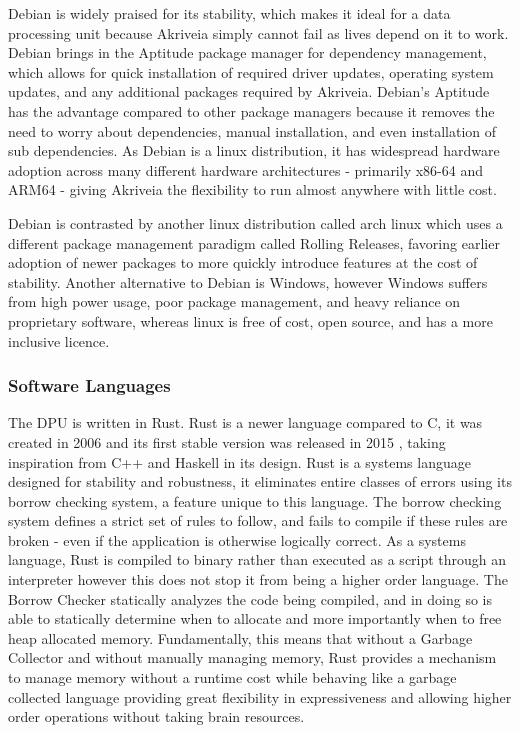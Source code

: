 \bigskip
Debian is widely praised for its stability, which makes it ideal for a data processing unit because Akriveia simply cannot fail as lives depend on it to work.
Debian brings in the \Gls{Aptitude} package manager for dependency management, which allows for quick installation of required driver updates, operating system updates, and any additional packages required by Akriveia.
Debian's Aptitude has the advantage compared to other package managers because it removes the need to worry about dependencies, manual installation, and even installation of sub dependencies.
As Debian is a linux distribution, it has widespread hardware adoption across many different hardware architectures - primarily \Gls{x86-64} and \Gls{ARM64} - giving Akriveia the flexibility to run almost anywhere with little cost.

\bigskip
Debian is contrasted by another linux distribution called arch linux which uses a different package management paradigm called \Gls{Rolling Releases}, favoring earlier adoption of newer packages to more quickly introduce features at the cost of stability.
Another alternative to Debian is Windows, however Windows suffers from high power usage, poor package management, and heavy reliance on proprietary software, whereas linux is free of cost, open source, and has a more inclusive licence.

\pagebreak
\subsubsection{Software Languages}
The DPU is written in \Gls{Rust}.
Rust is a newer language compared to C, it was created in 2006 \cite{rust_graydon_interview} and its first stable version was released in 2015 \cite{rust_releases}, taking inspiration from C++ and Haskell in its design.
Rust is a systems language designed for stability and robustness, it eliminates entire classes of errors using its borrow checking system, a feature unique to this language.
The borrow checking system defines a strict set of rules to follow, and fails to compile if these rules are broken - even if the application is otherwise logically correct.
As a systems language, Rust is compiled to binary rather than executed as a script through an interpreter however this does not stop it from being a higher order language.
The \Gls{Borrow Checker} statically analyzes the code being compiled, and in doing so is able to statically determine when to allocate and more importantly when to free heap allocated memory.
Fundamentally, this means that without a \Gls{Garbage Collector} and without manually managing memory, Rust provides a mechanism to manage memory without a runtime cost while behaving like a garbage collected language providing great flexibility in expressiveness and allowing higher order operations without taking brain resources.

